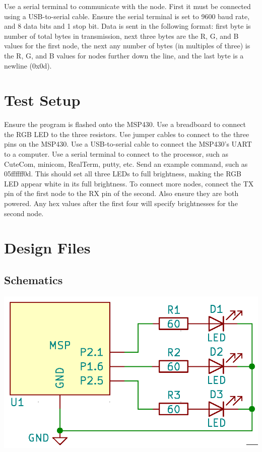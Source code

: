 \documentclass{hitec}
\begin{document}
Use a serial terminal to communicate with the node. First it must be connected using a USB-to-serial cable. Ensure the serial terminal is set to 9600 baud rate, and 8 data bits and 1 stop bit. Data is sent in the following format: first byte is number of total bytes in transmission, next three bytes are the R, G, and B values for the first node, the next any number of bytes (in multiples of three) is the R, G, and B values for nodes further down the line, and the last byte is a newline (0x0d).

\section{Test Setup}
Ensure the program is flashed onto the MSP430. Use a breadboard to connect the RGB LED to the three resistors. Use jumper cables to connect to the three pins on the MSP430. Use a USB-to-serial cable to connect the MSP430's UART to a computer. Use a serial terminal to connect to the processor, such as CuteCom, minicom, RealTerm, putty, etc. Send an example command, such as 05ffffff0d. This should set all three LEDs to full brightness, making the RGB LED appear white in its full brightness. To connect more nodes, connect the TX pin of the first node to the RX pin of the second. Also ensure they are both powered. Any hex values after the first four will specify brightnesses for the second node.


\section{Design Files}

\subsection{Schematics}

\includegraphics[scale=0.3]{detailed-block-diagram.png}
\end{document}
